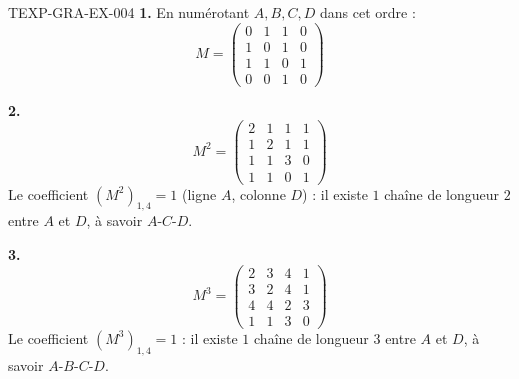 \begin{corrige}{TEXP-GRA-EX-004}
\textbf{1.} En numérotant $A,B,C,D$ dans cet ordre :
$$M=\begin{pmatrix}0&1&1&0\\1&0&1&0\\1&1&0&1\\0&0&1&0\end{pmatrix}$$

\textbf{2.}
$$M^2=\begin{pmatrix}2&1&1&1\\1&2&1&1\\1&1&3&0\\1&1&0&1\end{pmatrix}$$
Le coefficient $(M^2)_{1,4}=1$ (ligne $A$, colonne $D$) : il existe $1$ chaîne de longueur $2$ entre $A$ et $D$, à savoir $A\text{-}C\text{-}D$.

\textbf{3.}
$$M^3=\begin{pmatrix}2&3&4&1\\3&2&4&1\\4&4&2&3\\1&1&3&0\end{pmatrix}$$
Le coefficient $(M^3)_{1,4}=1$ : il existe $1$ chaîne de longueur $3$ entre $A$ et $D$, à savoir $A\text{-}B\text{-}C\text{-}D$.
\end{corrige}
